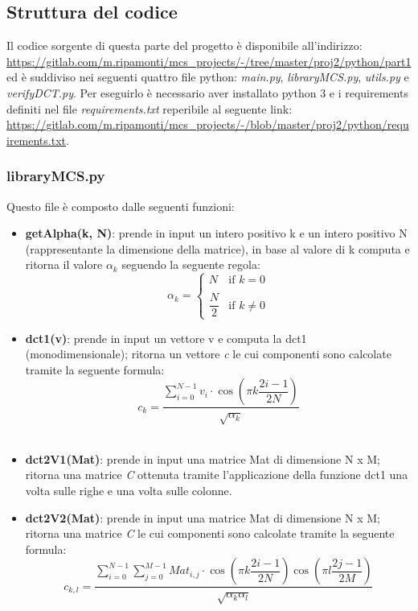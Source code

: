 \subsection{Struttura del codice}
Il codice sorgente di questa parte del progetto è disponibile all'indirizzo: 
\url{https://gitlab.com/m.ripamonti/mcs_projects/-/tree/master/proj2/python/part1} ed è suddiviso nei seguenti quattro file python: \textit{main.py}, \textit{libraryMCS.py}, \textit{utils.py} e \textit{verifyDCT.py}. Per eseguirlo è necessario aver installato python 3 e i requirements definiti nel file \emph{requirements.txt} reperibile al seguente link: \url{https://gitlab.com/m.ripamonti/mcs_projects/-/blob/master/proj2/python/requirements.txt}.

\subsubsection{libraryMCS.py}
Questo file è composto dalle seguenti funzioni:
\begin{itemize}
\item \textbf{getAlpha(k, N)}: prende in input un intero positivo k e un intero positivo N (rappresentante la dimensione della matrice), in base al valore di k computa e ritorna il valore \textit{$\alpha_k$} seguendo la seguente regola:
\[
\alpha_k = \begin{cases} N & \mbox{if } k = 0 \\\\ \dfrac{N}{2} & \mbox{if } {k \neq 0} \end{cases}
\]
\item \textbf{dct1(v)}\label{dct1}: prende in input un vettore v e computa la dct1 (monodimensionale); ritorna un vettore \textit{c} le cui componenti sono calcolate tramite la seguente formula:
\\
\[
c_k =  \dfrac{\sum_{i=0}^{N-1}v_i \cdot \cos(\pi k\dfrac{2i-1}{2N}) }{\sqrt{\alpha_k}}
\]
\\
\item \textbf{dct2V1(Mat)}\label{dct2V1}:  prende in input una matrice Mat di dimensione N x M; ritorna una matrice \textit{C} ottenuta tramite l'applicazione della funzione dct1 una volta sulle righe e una volta sulle colonne.
\item \textbf{dct2V2(Mat)}\label{dct2V2}: prende in input una matrice Mat di dimensione N x M; ritorna una matrice \textit{C} le cui componenti sono calcolate tramite la seguente formula:\\
\[
c_{k,l} =  \dfrac{\sum_{i=0}^{N-1}\sum_{j=0}^{M-1}Mat_{i,j} \cdot \cos(\pi k\dfrac{2i-1}{2N}) \cos(\pi l\dfrac{2j-1}{2M}) }{\sqrt{\alpha_k \alpha_l}}
\]
\\
\end{itemize}

